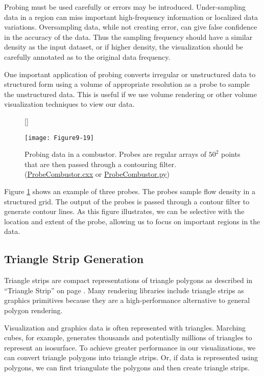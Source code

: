 Probing must be used carefully or errors may be introduced. Under-sampling data in a region can miss important high-frequency information or localized data variations. Oversampling data, while not creating error, can give false confidence in the accuracy of the data. Thus the sampling frequency should have a similar density as the input dataset, or if higher density, the visualization should be carefully annotated as to the original data frequency.

One important application of probing converts irregular or unstructured data to structured form using a volume of appropriate resolution as a probe to sample the unstructured data. This is useful if we use volume rendering or other volume visualization techniques to view our data.

\begin{figure}[!htb]
	[\FBwidth]
	{\caption{Probing data in a combustor.  Probes are regular arrays of $50^2$ points that are then passed through a contouring filter.(\href{https://lorensen.github.io/VTKExamples/site/Cxx/VisualizationAlgorithms/ProbeCombustor/}{ProbeCombustor.cxx} or \href{https://lorensen.github.io/VTKExamples/site/Python/VisualizationAlgorithms/ProbeCombustor/}{ProbeCombustor.py})}\label{fig:Figure9-19}}
	{\texttt{[image: Figure9-19]}}
\end{figure}

Figure \ref{fig:Figure9-19} shows an example of three probes. The probes sample flow density in a structured grid. The output of the probes is passed through a contour filter to generate contour lines. As this figure illustrates, we can be selective with the location and extent of the probe, allowing us to focus on important regions in the data.

\subsection{Triangle Strip Generation}

Triangle strips are compact representations of triangle polygons as described in ``Triangle Strip'' on page \pageref{subsec:linear_cells.triangle_strip}. Many rendering libraries include triangle strips as graphics primitives because they are a high-performance alternative to general polygon rendering.

Visualization and graphics data is often represented with triangles. Marching cubes, for example, generates thousands and potentially millions of triangles to represent an isosurface. To achieve greater performance in our visualizations, we can convert triangle polygons into triangle strips. Or, if data is represented using polygons, we can first triangulate the polygons and then create triangle strips.


